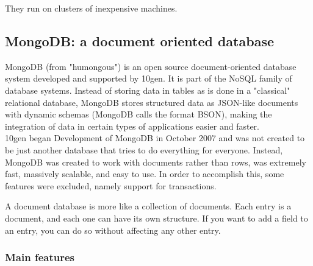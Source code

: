 They run on clusters of inexpensive machines.\\



\subsection{MongoDB: a document oriented database}

MongoDB (from "humongous") is an open source document-oriented database system developed and supported by 10gen. It is part of the NoSQL family of database systems. Instead of storing data in tables as is done in a "classical" relational database, MongoDB stores structured data as JSON-like documents with dynamic schemas (MongoDB calls the format BSON), making the integration of data in certain types of applications easier and faster. \\

10gen began Development of MongoDB in October 2007 and was not created to be just another database that tries to do everything for everyone. Instead, MongoDB was created to work with documents rather than rows, was extremely fast, massively scalable, and easy to use. In order to accomplish this, some features were excluded, namely support for transactions.

A document database is more like a collection of documents. Each entry is a document, and each one can have its own structure. If you want to add a field to an entry, you can do so without affecting any other entry.

\subsubsection{Main features}


